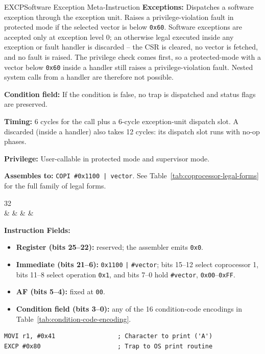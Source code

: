 \begin{instructionbox}{EXCP}{Software Exception Meta-Instruction}
	\textbf{Exceptions:} Dispatches a software exception through the exception unit. Raises a privilege-violation fault
	in protected mode if the selected vector is below \texttt{0x60}. Software exceptions are accepted only at exception level 0;
	an otherwise legal  executed inside any exception or fault handler is discarded -- the CSR
	is cleared, no vector is fetched, and no fault is raised. The privilege check comes first, so a protected-mode
	 with a vector below \texttt{0x60} inside a handler still raises a privilege-violation fault. Nested
	system calls from a handler are therefore not possible.

	\textbf{Condition field:} If the condition is false, no trap is dispatched and status flags are preserved.

	\textbf{Timing:} 6 cycles for the call plus a 6-cycle exception-unit dispatch slot. A discarded 
	(inside a handler) also takes 12 cycles: its dispatch slot runs with no-op phases.

	\textbf{Privilege:} User-callable in protected mode and supervisor mode.

	\textbf{Assembles to:} \texttt{COPI \#0x1100 | vector}. See Table~\ref{tab:coprocessor-legal-forms} for the full family of legal forms.

	\begin{center}
		\begin{bytefield}[bitwidth=1.1em]{32}
			 \\
			 &
			 &
			 &
			 &
		\end{bytefield}
	\end{center}

	\textbf{Instruction Fields:}
	\begin{itemize}
		\item \textbf{Register (bits 25--22):} reserved; the assembler emits \texttt{0x0}.
		\item \textbf{Immediate (bits 21--6):} \texttt{0x1100} \texttt{|} \texttt{\#vector}; bits 15--12 select
		      coprocessor 1, bits 11--8 select operation \texttt{0x1}, and bits 7--0 hold \texttt{\#vector},
		      \texttt{0x00}--\texttt{0xFF}.
		\item \textbf{AF (bits 5--4):} fixed at \texttt{00}.
		\item \textbf{Condition field (bits 3--0):} any of the 16 condition-code encodings in
		      Table~\ref{tab:condition-code-encoding}.
	\end{itemize}

	\begin{example}
		\begin{lstlisting}
MOVI r1, #0x41                 ; Character to print ('A')
EXCP #0x80                     ; Trap to OS print routine
		\end{lstlisting}
		\caption{Triggering a Software Exception}
	\end{example}
\end{instructionbox}

